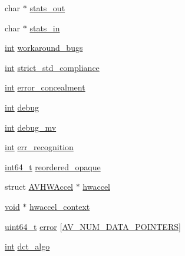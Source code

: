 \begin{DoxyCompactItemize}
char $\ast$ \hyperlink{struct_a_v_codec_context_a0f5bec27a856369ac81ccc9784f52e86}{stats\+\_\+out}
\item 
char $\ast$ \hyperlink{struct_a_v_codec_context_a4ee62148c5519301149f75e7296e84e1}{stats\+\_\+in}
\item 
\hyperlink{xmltok_8h_a5a0d4a5641ce434f1d23533f2b2e6653}{int} \hyperlink{struct_a_v_codec_context_a4649a6454a0f784794b89afdc44da669}{workaround\+\_\+bugs}
\item 
\hyperlink{xmltok_8h_a5a0d4a5641ce434f1d23533f2b2e6653}{int} \hyperlink{struct_a_v_codec_context_a3090804569341ca235e3adbdc03318d2}{strict\+\_\+std\+\_\+compliance}
\item 
\hyperlink{xmltok_8h_a5a0d4a5641ce434f1d23533f2b2e6653}{int} \hyperlink{struct_a_v_codec_context_a268759f44c37eda9f79048bd0ee05ffc}{error\+\_\+concealment}
\item 
\hyperlink{xmltok_8h_a5a0d4a5641ce434f1d23533f2b2e6653}{int} \hyperlink{struct_a_v_codec_context_a1c52e4da25b608b2b9a80af21bb86d58}{debug}
\item 
\hyperlink{xmltok_8h_a5a0d4a5641ce434f1d23533f2b2e6653}{int} \hyperlink{struct_a_v_codec_context_ad823755aadd6eec734c216dbb17f145d}{debug\+\_\+mv}
\item 
\hyperlink{xmltok_8h_a5a0d4a5641ce434f1d23533f2b2e6653}{int} \hyperlink{struct_a_v_codec_context_af9978d9bd6ac80a494ef1b78fe1d004f}{err\+\_\+recognition}
\item 
\hyperlink{lib-src_2ffmpeg_2win32_2stdint_8h_a67a9885ef4908cb72ce26d75b694386c}{int64\+\_\+t} \hyperlink{struct_a_v_codec_context_a64c09907902b41744c3ea60c89fd42fb}{reordered\+\_\+opaque}
\item 
struct \hyperlink{struct_a_v_h_w_accel}{A\+V\+H\+W\+Accel} $\ast$ \hyperlink{struct_a_v_codec_context_ab1030454a58273fd5ab88679b1eed7cc}{hwaccel}
\item 
\hyperlink{sound_8c_ae35f5844602719cf66324f4de2a658b3}{void} $\ast$ \hyperlink{struct_a_v_codec_context_ab222f7d747dfdceff0a76999e09648c0}{hwaccel\+\_\+context}
\item 
\hyperlink{lib-src_2ffmpeg_2win32_2stdint_8h_aec6fcb673ff035718c238c8c9d544c47}{uint64\+\_\+t} \hyperlink{struct_a_v_codec_context_acb7a609f77fd8876c8433c3673e9f9d5}{error} \mbox{[}\hyperlink{ffmpeg_2libavutil_2frame_8h_add80189702cf0f5ea82718576fb43201}{A\+V\+\_\+\+N\+U\+M\+\_\+\+D\+A\+T\+A\+\_\+\+P\+O\+I\+N\+T\+E\+RS}\mbox{]}
\item 
\hyperlink{xmltok_8h_a5a0d4a5641ce434f1d23533f2b2e6653}{int} \hyperlink{struct_a_v_codec_context_a270c5551611475aebd7f9ce154d7f263}{dct\+\_\+algo}

\end{DoxyCompactItemize}
